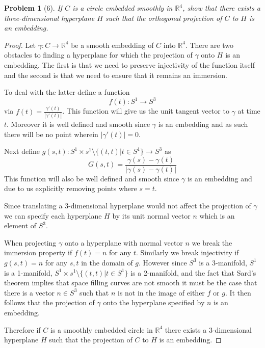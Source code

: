 \documentclass[10pt]{article}
\newcommand{\sk}{\vskip 10mm}
\newcommand{\bb}[1]{\mathbb{#1}}
\theoremstyle{plain}
\newtheorem{problem}{Problem}
\theoremstyle{remark}
\begin{document}
\sk

\begin{problem}[6]
  If $C$ is a circle embedded smoothly in $\bb{R}^4$, show that
  there exists a three-dimensional hyperplane $H$ such that the
  orthogonal projection of $C$ to $H$ is an embedding.
\end{problem}

\begin{proof}
  Let $\gamma:C\rightarrow\bb{R}^4$ be a smooth embedding of $C$ into $\bb{R}^4$.
  There are two obstacles to finding a hyperplane for which the
  projection of $\gamma$ onto $H$ is an embedding. The first is that
  we need to preserve injectivity of the function itself and the
  second is that we need to ensure that it remains an immersion.

  To deal with the latter define a function
  \[
    f(t):S^1\rightarrow S^3
  \]
  via $f(t)=\frac{\gamma'(t)}{|\gamma'(t)|}$. This function will give us the
  unit tangent vector to $\gamma$ at time $t$. Moreover it is well defined
  and smooth since $\gamma$ is an embedding and as such there will be
  no point wherein $|\gamma'(t)|=0$.

  Next define $g(s,t):S^1\times s^1\setminus\{(t,t)|t\in S^1\}\rightarrow S^3$ as
  \[
    G(s,t) = \frac{\gamma(s)-\gamma(t)}{|\gamma(s)-\gamma(t)|}
  \]
  This function will also be well defined and smooth since $\gamma$ is an embedding
  and due to us explicitly removing points where $s=t$.

  Since translating a 3-dimensional hyperplane would not affect the projection
  of $\gamma$ we can specify each hyperplane $H$ by its unit normal vector $n$ which is
  an element of $S^3$.

  When projecting $\gamma$ onto a hyperplane with normal vector $n$ we break
  the immersion property if $f(t)=n$ for any $t$. Similarly we break
  injectivity if $g(s,t)=n$ for any $s,t$ in the domain of $g$. However
  since $S^3$ is a 3-manifold, $S^1$ is a 1-manifold, $S^1\times s^1\setminus\{(t,t)|t\in S^1\}$
  is a 2-manifold, and the fact that Sard's theorem implies that
  space filling curves are not smooth it must be the case that
  there is a vector $n\in S^3$ such that $n$ is not in the image of either $f$
  or $g$. It then follows that the projection of $\gamma$ onto the hyperplane
  specified by $n$ is an embedding.

  Therefore if $C$ is a smoothly embedded circle in $\bb{R}^4$ there
  exists a 3-dimensional hyperplane $H$ such that the projection of $C$
  to $H$ is an embedding.
\end{proof}

\sk

\end{document}
